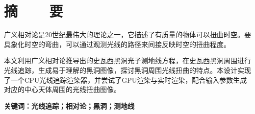 %
%
%
%
%

\topskip=0pt

\vspace*{-7mm}

\begin{center}
  \songti{}\textbf{\thesisTitle}
\end{center}

\vspace*{2mm}

{\let\clearpage\relax \chapter*{\textmd{摘~~~~要}}}
\setcounter{page}{1}

\vspace*{1mm}

\setlength{\parskip}{0em}

广义相对论是20世纪最伟大的理论之一，它描述了有质量的物体可以扭曲时空。要具象化时空的弯曲，可以通过观测光线的路径来间接反映时空的扭曲程度。

本文利用广义相对论推导出的史瓦西黑洞光子测地线方程，在史瓦西黑洞周围进行光线追踪，生成易于理解的黑洞图像，探讨黑洞周围光线扭曲的特点。本设计实现了一个CPU光线追踪渲染器，并尝试了GPU渲染与实时渲染，配合输入参数生成对应的中心天体周围的光线扭曲图像。

\vspace{4ex}\noindent\textbf{\heiti 关键词：光线追踪；相对论；黑洞；测地线}
\newpage

\topskip=0pt

\vspace*{2mm}

\begin{spacing}{0.95}
  \centering
  \heiti{}\textbf{\thesisTitleEN}
\end{spacing}

